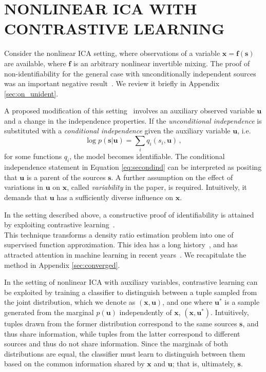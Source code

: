 \documentclass[letterpaper]{article}
\theoremstyle{definition}
\begin{document}
\section{NONLINEAR ICA WITH CONTRASTIVE LEARNING}
\label{sec:nlica}

Consider the nonlinear ICA setting, where observations of a variable $\bm{x} = \bm{f}(\bm{s})$ are available, where $\bm{f}$ is an arbitrary nonlinear invertible mixing. The proof of non-identifiability for the general case with unconditionally independent sources was an important negative result~\cite{hyvarinen1999nonlinear}. We review it briefly in Appendix \ref{sec:on_unident}.

A proposed modification of this setting~\cite{hyvarinen19a} involves an auxiliary observed variable $\bm{u}$ and a change in the independence properties. If the \textit{unconditional independence} is substituted with a \textit{conditional independence} given the auxiliary variable $\bm{u}$, i.e.
\begin{equation}
    \log p( \bm{s} | \bm{u}) = \sum_i q_i(s_i, \bm{u})\,,\label{eq:secondind}
\end{equation}
for some functions $q_i$, the model becomes identifiable. The conditional independence statement in Equation \ref{eq:secondind} can be interpreted as positing that $\bm{u}$ is a parent of the sources $\bm{s}$. A further assumption on the effect of variations in $\bm{u}$ on $\bm{x}$, called \textit{variability} in the paper, is required. Intuitively, it demands that $\bm{u}$ has a sufficiently diverse influence on $\bm{x}$.

In the setting described above, a constructive proof of identifiability is attained by exploiting contrastive learning~\cite{gutmann2010noise}.\\\label{sec:contr_learn}
This technique transforms a density ratio estimation problem into one of supervised function approximation. This idea has a long history~\cite{friedman2001elements}, and has attracted attention in machine learning in recent years~\cite{goodfellow2014generative, gutmann2010noise}. We recapitulate the method in Appendix \ref{sec:converged}.

In the setting of nonlinear ICA with auxiliary variables, contrastive learning can be exploited by training a classifier to distinguish between a tuple sampled from the joint distribution, which we denote as $(\bm{x}, \bm{u})$, and one where $\bm{u}^*$ is a sample generated from the marginal $p(\bm{u})$ independently of $\bm{x}$, $(\bm{x}, \bm{u}^*)$.
Intuitively, tuples drawn from the former distribution correspond to the same sources $\bm{s}$, and thus share information, while tuples from the latter correspond to different sources and thus do not share information.
Since the marginals of both distributions are equal, the classifier must learn to distinguish between them based on the common information shared by $\bm{x}$ and $\bm{u}$; that is, ultimately, $\bm{s}$.
\end{document}
